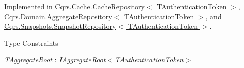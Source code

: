 Implemented in \hyperlink{classCqrs_1_1Cache_1_1CacheRepository_a69df7ee1dc2e4cd38431ab987655eab3_a69df7ee1dc2e4cd38431ab987655eab3}{Cqrs.\+Cache.\+Cache\+Repository$<$ T\+Authentication\+Token $>$}, \hyperlink{classCqrs_1_1Domain_1_1AggregateRepository_aff9e828d19a091a4275f635bee4b3c9b_aff9e828d19a091a4275f635bee4b3c9b}{Cqrs.\+Domain.\+Aggregate\+Repository$<$ T\+Authentication\+Token $>$}, and \hyperlink{classCqrs_1_1Snapshots_1_1SnapshotRepository_aac1a574562f8c6134d02a44cd10b8afa_aac1a574562f8c6134d02a44cd10b8afa}{Cqrs.\+Snapshots.\+Snapshot\+Repository$<$ T\+Authentication\+Token $>$}.

\begin{Desc}
\item[Type Constraints]\begin{description}
\item[{\em T\+Aggregate\+Root} : {\em I\+Aggregate\+Root$<$T\+Authentication\+Token$>$}]\end{description}
\end{Desc}
